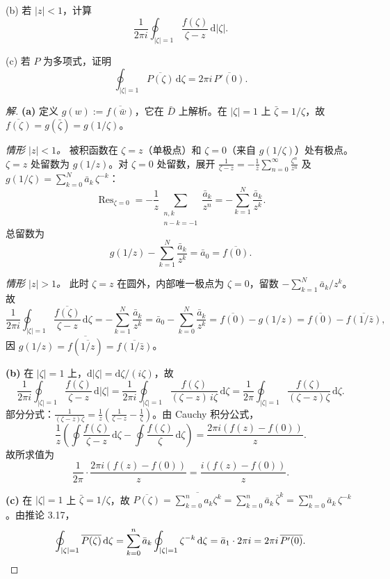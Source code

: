 \documentclass[11pt,a4paper]{article}
\newcommand{\dd}{\mathrm{d}}
\theoremstyle{definition}
\newenvironment{solution}{\begin{proof}[解]}{\end{proof}}
\begin{document}
(b) 若 $|z| < 1$，计算
\[
  \frac{1}{2\pi i}\oint_{|\zeta|=1}
  \frac{f(\zeta)}{\zeta - z}\,\dd|\zeta|.
\]

(c) 若 $P$ 为多项式，证明
\[
  \oint_{|\zeta|=1} \overline{P(\zeta)}\,\dd\zeta
  = 2\pi i\,\overline{P'(0)}.
\]

\begin{solution}
  \textbf{(a)}\;
  定义 $g(w) := \overline{f(\bar{w})}$，它在 $\bar{D}$ 上解析。在 $|\zeta|=1$ 上 $\bar\zeta = 1/\zeta$，故 $\overline{f(\zeta)} = g(\bar\zeta) = g(1/\zeta)$。

  \smallskip

  \textit{情形 $|z|<1$。}\;
  被积函数在 $\zeta = z$（单极点）和 $\zeta = 0$（来自 $g(1/\zeta)$）处有极点。$\zeta = z$ 处留数为 $g(1/z)$。对 $\zeta = 0$ 处留数，展开 $\frac{1}{\zeta-z} = -\frac{1}{z}\sum_{n=0}^{\infty}\frac{\zeta^n}{z^n}$ 及 $g(1/\zeta) = \sum_{k=0}^{N}\bar{a}_k\,\zeta^{-k}$：
  \[
    \operatorname{Res}_{\zeta=0}
    = -\frac{1}{z}\sum_{\substack{n,k\\ n-k=-1}}
    \frac{\bar{a}_k}{z^n}
    = -\sum_{k=1}^{N}\frac{\bar{a}_k}{z^k}.
  \]
  总留数为
  \[
    g(1/z) - \sum_{k=1}^{N}\frac{\bar{a}_k}{z^k}
    = \bar{a}_0 = \overline{f(0)}.
  \]

  \smallskip

  \textit{情形 $|z|>1$。}\;
  此时 $\zeta = z$ 在圆外，内部唯一极点为 $\zeta = 0$，留数 $-\sum_{k=1}^{N}\bar{a}_k/z^k$。故
  \[
    \frac{1}{2\pi i}\oint_{|\zeta|=1}
    \frac{\overline{f(\zeta)}}{\zeta-z}\,\dd\zeta
    = -\sum_{k=1}^{N}\frac{\bar{a}_k}{z^k}
    = \bar{a}_0 - \sum_{k=0}^{N}\frac{\bar{a}_k}{z^k}
    = \overline{f(0)} - g(1/z)
    = \overline{f(0)} - \overline{f(1/\bar{z})},
  \]
  因 $g(1/z) = \overline{f(\overline{1/z})} = \overline{f(1/\bar{z})}$。

  \medskip

  \textbf{(b)}\;
  在 $|\zeta|=1$ 上，$\dd|\zeta| = \dd\zeta/(i\zeta)$，故
  \[
    \frac{1}{2\pi i}\oint_{|\zeta|=1}
    \frac{f(\zeta)}{\zeta-z}\,\dd|\zeta|
    = \frac{1}{2\pi i}\oint_{|\zeta|=1}
    \frac{f(\zeta)}{(\zeta-z)\,i\zeta}\,\dd\zeta
    = \frac{1}{2\pi}\oint_{|\zeta|=1}
    \frac{f(\zeta)}{(\zeta-z)\zeta}\,\dd\zeta.
  \]
  部分分式：$\frac{1}{(\zeta-z)\zeta} = \frac{1}{z}\!\left(\frac{1}{\zeta-z}-\frac{1}{\zeta}\right)$。由 Cauchy 积分公式，
  \[
    \frac{1}{z}\!\left(
      \oint\frac{f(\zeta)}{\zeta-z}\,\dd\zeta
      -\oint\frac{f(\zeta)}{\zeta}\,\dd\zeta
    \right)
    = \frac{2\pi i(f(z)-f(0))}{z}.
  \]
  故所求值为
  \[
    \frac{1}{2\pi}\cdot\frac{2\pi i(f(z)-f(0))}{z}
    = \frac{i(f(z)-f(0))}{z}.
  \]

  \medskip

  \textbf{(c)}\;
  在 $|\zeta|=1$ 上 $\bar\zeta = 1/\zeta$，故 $\overline{P(\zeta)} = \overline{\sum_{k=0}^{n}a_k\zeta^k} = \sum_{k=0}^{n}\bar{a}_k\,\bar\zeta^k = \sum_{k=0}^{n}\bar{a}_k\,\zeta^{-k}$。由推论 3.17，
  \[
    \oint_{|\zeta|=1}\overline{P(\zeta)}\,\dd\zeta
    = \sum_{k=0}^{n}\bar{a}_k\oint_{|\zeta|=1}\zeta^{-k}\,\dd\zeta
    = \bar{a}_1\cdot 2\pi i
    = 2\pi i\,\overline{P'(0)}.\qedhere
  \]
\end{solution}
\end{document}
